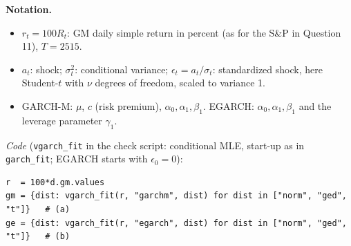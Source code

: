 \documentclass[11pt,a4paper]{article}
\newenvironment{notacao}{\par\smallskip\noindent\textbf{Notation.}\begin{itemize}[leftmargin=1.4em,topsep=1pt,itemsep=0pt]\small}{\end{itemize}}
\begin{document}
\begin{sol}
\begin{notacao}
\item $r_t=100R_t$: GM daily simple return in percent (as for the S\&P in Question 11), $T=2515$.
\item $a_t$: shock; $\sigma_t^2$: conditional variance; $\epsilon_t=a_t/\sigma_t$: standardized shock, here Student-$t$ with $\nu$ degrees of freedom, scaled to variance 1.
\item GARCH-M: $\mu$, $c$ (risk premium), $\alpha_0,\alpha_1,\beta_1$. EGARCH: $\alpha_0,\alpha_1,\beta_1$ and the leverage parameter $\gamma_1$.
\end{notacao}
\noindent\textit{Code} (\texttt{vgarch\_fit} in the check script: conditional MLE, start-up as in \texttt{garch\_fit};
EGARCH starts with $\epsilon_0=0$):
\begingroup\footnotesize
\begin{verbatim}
r  = 100*d.gm.values
gm = {dist: vgarch_fit(r, "garchm", dist) for dist in ["norm", "ged", "t"]}   # (a)
ge = {dist: vgarch_fit(r, "egarch", dist) for dist in ["norm", "ged", "t"]}   # (b)
\end{verbatim}
\endgroup


\end{sol}
\end{document}
